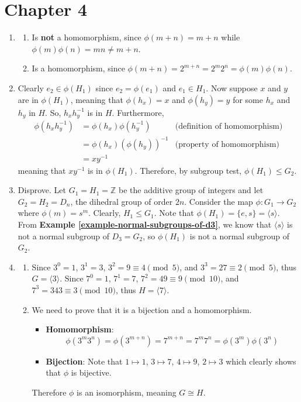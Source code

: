 \section*{Chapter 4}
\begin{enumerate}
    \item \begin{enumerate}[label=(\alph*)]
        \item Is \textbf{not} a homomorphism, since $\phi(m+n) = m + n$ while $\phi(m)\phi(n) = mn \neq m+n$.
        \item Is a homomorphism, since $\phi(m+n) = 2^{m+n} = 2^m2^n = \phi(m)\phi(n)$.
    \end{enumerate}

    \item Clearly $e_2 \in \phi(H_1)$ since $e_2 = \phi(e_1)$ and $e_1 \in H_1$. Now suppose $x$ and $y$ are in $\phi(H_1)$, meaning that $\phi(h_x) = x$ and $\phi(h_y) = y$ for some $h_x$ and $h_y$ in $H$. So, $h_xh_y^{-1}$ is in $H$. Furthermore,
    \begin{align*}
    \phi(h_xh_y^{-1}) &= \phi(h_x)\phi(h_y^{-1}) & \text{(definition of homomorphism)}\\
    &= \phi(h_x)\left(\phi(h_y)\right)^{-1} & \text{(property of homomorphism)}\\
    &= xy^{-1}
    \end{align*}
    meaning that $xy^{-1}$ is in $\phi(H_1)$. Therefore, by subgroup test, $\phi(H_1) \leq G_2$.

    \item Disprove. Let $G_1 = H_1 = \mathbb{Z}$ be the additive group of integers and let $G_2 = H_2 = D_n$, the dihedral group of order $2n$. Consider the map $\phi: G_1 \to G_2$ where $\phi(m) = s^m$. Clearly, $H_1 \leq G_1$. Note that $\phi(H_1) = \{e, s\} = \langle s \rangle$. From \textbf{Example \ref{example-normal-subgroups-of-d3}}, we know that $\langle s \rangle$ is not a normal subgroup of $D_3 = G_2$, so $\phi(H_1)$ is not a normal subgroup of $G_2$.

    \item \begin{enumerate}[label=(\roman*)]
        \item Since $3^0 = 1$, $3^1 = 3$, $3^2 = 9 \equiv 4 \pmod{5}$, and $3^3 = 27 \equiv 2 \pmod{5}$, thus $G = \langle 3 \rangle$. Since $7^0 = 1$, $7^1 = 7$, $7^2 = 49 \equiv 9 \pmod{10}$, and $7^3 = 343 \equiv 3 \pmod{10}$, thus $H = \langle 7 \rangle$.
        \item We need to prove that it is a bijection and a homomorphism.
        \begin{itemize}
            \item \textbf{Homomorphism}:
            \[
                \phi(3^m3^n) = \phi(3^{m+n}) = 7^{m+n} = 7^m7^n = \phi(3^m)\phi(3^n)
            \]
            \item \textbf{Bijection}: Note that $1 \mapsto 1$, $3 \mapsto 7$, $4 \mapsto 9$, $2 \mapsto 3$ which clearly shows that $\phi$ is bijective.
        \end{itemize}
        Therefore $\phi$ is an isomorphism, meaning $G \cong H$.
    \end{enumerate}


\end{enumerate}
